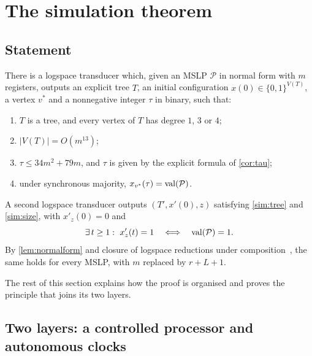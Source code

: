 \section{The simulation theorem}\label{sec:simulation}

\subsection{Statement}

\begin{theorem}\label{thm:simulation}
There is a logspace transducer which, given an MSLP $\mathcal P$ in normal form with $m$
registers, outputs an explicit tree $T$, an initial configuration $x(0)\in\{0,1\}^{V(T)}$, a vertex
$v^\ast$ and a nonnegative integer $\tau$ in binary, such that:
\begin{enumerate}[label=(\roman*)]
\item\label{sim:tree} $T$ is a tree, and every vertex of $T$ has degree $1$, $3$ or $4$;
\item\label{sim:size} $|V(T)|=O(m^{13})$;
\item\label{sim:time} $\tau\le 34m^2+79m$, and $\tau$ is given by the explicit formula of
  \cref{cor:tau};
\item\label{sim:correct} under synchronous majority, $x_{v^\ast}(\tau)=\operatorname{val}(\mathcal P)$.
\end{enumerate}
A second logspace transducer outputs $(T',x'(0),z)$ satisfying \ref{sim:tree} and \ref{sim:size}, with
$x'_z(0)=0$ and
\[
\exists\, t\ge 1:\ x'_z(t)=1\quad\Longleftrightarrow\quad\val(\mathcal P)=1.
\]
By \cref{lem:normalform} and closure of logspace reductions under composition~\cite{Jon75,LL76},
the same holds for every MSLP, with $m$ replaced by $r+L+1$.
\end{theorem}

The rest of this section explains how the proof is organised and proves the principle that joins
its two layers.

\subsection{Two layers: a controlled processor and autonomous clocks}

